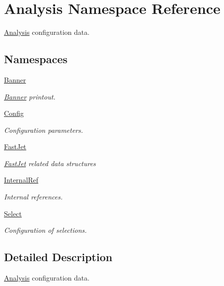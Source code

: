 \hypertarget{namespaceAnalysis}{}\section{Analysis Namespace Reference}
\label{namespaceAnalysis}


\hyperlink{namespaceAnalysis}{Analysis} configuration data.  


\subsection*{Namespaces}
\begin{DoxyCompactItemize}
\item 
 \hyperlink{namespaceAnalysis_1_1Banner}{Banner}
\begin{DoxyCompactList}\small\item\em \hyperlink{namespaceAnalysis_1_1Banner}{Banner} printout. \end{DoxyCompactList}\item 
 \hyperlink{namespaceAnalysis_1_1Config}{Config}
\begin{DoxyCompactList}\small\item\em Configuration parameters. \end{DoxyCompactList}\item 
 \hyperlink{namespaceAnalysis_1_1FastJet}{Fast\+Jet}
\begin{DoxyCompactList}\small\item\em {\ttfamily \hyperlink{namespaceAnalysis_1_1FastJet}{Fast\+Jet}} related data structures \end{DoxyCompactList}\item 
 \hyperlink{namespaceAnalysis_1_1InternalRef}{Internal\+Ref}
\begin{DoxyCompactList}\small\item\em Internal references. \end{DoxyCompactList}\item 
 \hyperlink{namespaceAnalysis_1_1Select}{Select}
\begin{DoxyCompactList}\small\item\em Configuration of selections. \end{DoxyCompactList}\end{DoxyCompactItemize}


\subsection{Detailed Description}
\hyperlink{namespaceAnalysis}{Analysis} configuration data. 

